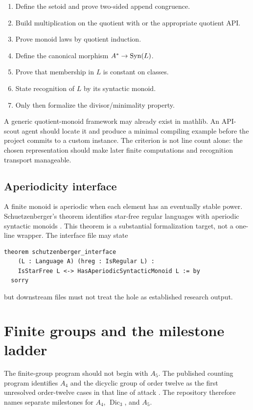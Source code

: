 \documentclass{amsart}
\begin{document}
\begin{enumerate}
  \item Define the setoid and prove two-sided append congruence.
  \item Build multiplication on the quotient with  or the appropriate quotient API.
  \item Prove monoid laws by quotient induction.
  \item Define the canonical morphism $A^\ast\to\operatorname{Syn}(L)$.
  \item Prove that membership in $L$ is constant on classes.
  \item State recognition of $L$ by its syntactic monoid.
  \item Only then formalize the divisor/minimality property.
\end{enumerate}

A generic quotient-monoid framework may already exist in mathlib.  An API-scout agent should locate it and produce a minimal compiling example before the project commits to a custom instance.  The criterion is not line count alone: the chosen representation should make later finite computations and recognition transport manageable.

\subsection{Aperiodicity interface}

A finite monoid is aperiodic when each element has an eventually stable power.  Schuetzenberger's theorem identifies star-free regular languages with aperiodic syntactic monoids \cite{schutzenberger1965finite,mcnaughtonPapert1971counterfree}.  This theorem is a substantial formalization target, not a one-line wrapper.  The interface file may state
\begin{lstlisting}[language={}]
theorem schutzenberger_interface
    (L : Language A) (hreg : IsRegular L) :
    IsStarFree L <-> HasAperiodicSyntacticMonoid L := by
  sorry
\end{lstlisting}
but downstream files must not treat the hole as established research output.

\section{Finite groups and the milestone ladder}

The finite-group program should not begin with $A_5$.  The published counting program identifies $A_4$ and the dicyclic group of order twelve as the first unresolved order-twelve cases in that line of attack \cite{bourne2017counting,bourneRuskuc2016}.  The repository therefore names separate milestones for $A_4$, $\operatorname{Dic}_3$, and $A_5$.
\end{document}
